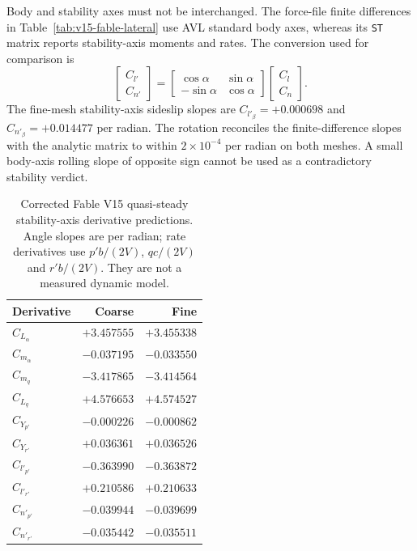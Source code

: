 \documentclass[10pt,letterpaper]{article}
\begin{document}
Body and stability axes must not be interchanged. The force-file finite
differences in Table~\ref{tab:v15-fable-lateral} use AVL standard body axes,
whereas its \texttt{ST} matrix reports stability-axis moments and rates.
The conversion used for comparison is
\begin{equation}
\begin{bmatrix}C_{l'}\\C_{n'}\end{bmatrix}=
\begin{bmatrix}\cos\alpha&\sin\alpha\\-\sin\alpha&\cos\alpha\end{bmatrix}
\begin{bmatrix}C_l\\C_n\end{bmatrix}.
\end{equation}
The fine-mesh stability-axis sideslip slopes are $C_{l'_\beta}=+0.000698$ and $C_{n'_\beta}=+0.014477$ per radian. The rotation reconciles the finite-difference slopes with the analytic matrix to within $2\times10^{-4}$ per radian on both meshes. A small body-axis rolling slope of opposite sign cannot be used as a contradictory stability verdict.

\begin{table}[p]\centering\small
\caption{Corrected Fable V15 quasi-steady stability-axis derivative predictions. Angle slopes are per radian; rate derivatives use $p'b/(2V)$, $qc/(2V)$ and $r'b/(2V)$. They are not a measured dynamic model.}
\label{tab:fable-corrected-rates}
\begin{tabular}{lrr}\toprule
Derivative & Coarse & Fine\\\midrule
$C_{L_\alpha}$ & $+3.457555$ & $+3.455338$\\
$C_{m_\alpha}$ & $-0.037195$ & $-0.033550$\\
$C_{m_q}$ & $-3.417865$ & $-3.414564$\\
$C_{L_q}$ & $+4.576653$ & $+4.574527$\\
$C_{Y_{p\prime}}$ & $-0.000226$ & $-0.000862$\\
$C_{Y_{r\prime}}$ & $+0.036361$ & $+0.036526$\\
$C_{l\prime_{p\prime}}$ & $-0.363990$ & $-0.363872$\\
$C_{l\prime_{r\prime}}$ & $+0.210586$ & $+0.210633$\\
$C_{n\prime_{p\prime}}$ & $-0.039944$ & $-0.039699$\\
$C_{n\prime_{r\prime}}$ & $-0.035442$ & $-0.035511$\\
\bottomrule\end{tabular}\end{table}
\end{document}
